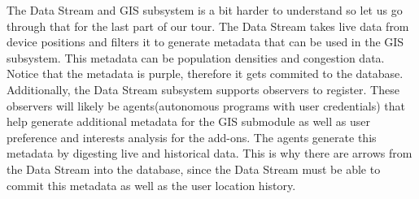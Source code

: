 The Data Stream and GIS subsystem is a bit harder to understand so let us go through that for the last part of our tour. The Data Stream takes live data from device positions and filters it to generate metadata that can be used in the GIS subsystem. This metadata can be population densities and congestion data. Notice that the metadata is purple, therefore it gets commited to the database. Additionally, the Data Stream subsystem supports observers to register. These observers will likely be agents(autonomous programs with user credentials) that help generate additional metadata for the GIS submodule as well as user preference and interests analysis for the add-ons. The agents generate this metadata by digesting live and historical data. This is why there are arrows from the Data Stream into the database, since the Data Stream must be able to commit this metadata as well as the user location history.
